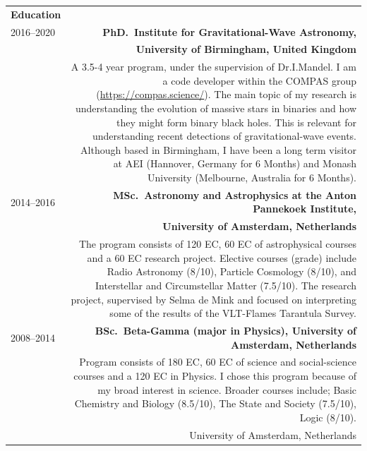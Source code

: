 \documentclass[]{res} %
\begin{document}




\begin{tabular}{L!{\VRule}R}
\Large \bf Education \normalsize & \\ [5pt]
2016--2020 &{\textbf{PhD.\ Institute for Gravitational-Wave Astronomy,}}\\
          &{\textbf{University of Birmingham, United Kingdom}}\\[1pt]
          &{A 3.5-4 year program, under the supervision of Dr.I.Mandel. 
           I am a code developer within the COMPAS group (\url{https://compas.science/}). 
           The main topic of my research is
          understanding the evolution of massive stars in binaries and how they might form binary
          black holes. This is relevant for understanding recent detections
           of gravitational-wave events. Although based in Birmingham, I have been a long term 
            visitor at AEI (Hannover, Germany for 6 Months) and
            Monash University (Melbourne, Australia for 6 Months).}\\[5pt]

2014--2016&{\textbf{MSc.\ Astronomy and Astrophysics at the Anton Pannekoek Institute,}}\\
          &{\textbf{University of Amsterdam, Netherlands}}\\[1pt]
	  &{The program consists of 120 EC, 60 EC of astrophysical courses and a 60 EC research project. 
            Elective courses (grade) include Radio Astronomy (8/10), Particle Cosmology (8/10), and Interstellar and Circumstellar Matter (7.5/10). The research project, supervised by Selma de Mink and focused on interpreting some of the results of the VLT-Flames Tarantula Survey. }\\[5pt]


2008--2014&{\bf BSc.\ Beta-Gamma (major in Physics), University of Amsterdam, Netherlands}\\[1pt]
          &{Program consists of 180 EC, 60 EC of science and social-science courses and a 120 EC in Physics.  I chose this program because of my broad interest in science. Broader courses include; Basic Chemistry and Biology (8.5/10), The State and Society (7.5/10), Logic (8/10).}\\
	  &{University of Amsterdam, Netherlands}\\
\end{tabular}
\end{document}
